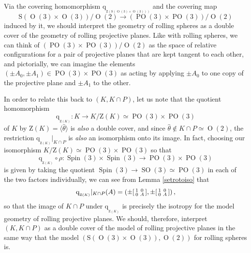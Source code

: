 \documentclass[12pt,a4paper]{amsart}
\theoremstyle{definition}
\DeclareMathOperator{\Orth}{O}
\DeclareMathOperator{\SOrth}{SO}
\DeclareMathOperator{\Spin}{Spin}
\DeclareMathOperator{\POrth}{PO}
\newcommand{\quot}[1]{\mathrm{q}_{{}_{#1}}}
\newenvironment{smallbmatrix}
  {\left[\begin{smallmatrix}}
  {\end{smallmatrix}\right]}
\begin{document}
Via the covering homomorphism $\quot{\mathrm{Z}(\mathrm{S}(\Orth(3)\times\Orth(3)))}$ and the covering map
\[\mathrm{S}(\Orth(3)\times\Orth(3))/\Orth(2)\to(\POrth(3)\times\POrth(3))/\Orth(2)\]
induced by it, we should interpret the geometry of rolling spheres as a double cover of the geometry of rolling projective planes. Like with rolling spheres, we can think of $(\POrth(3)\times\POrth(3))/\Orth(2)$ as the space of relative configurations for a pair of projective planes that are kept tangent to each other, and pictorially, we can imagine the elements $(\pm A_0,\pm A_1)\in\POrth(3)\times\POrth(3)$ as acting by applying $\pm A_0$ to one copy of the projective plane and $\pm A_1$ to the other.

In order to relate this back to $(K,K\cap P)$, let us note that the quotient homomorphism
\[\quot{\mathrm{Z}(K)}\!:K\to K/\mathrm{Z}(K)\simeq\POrth(3)\times\POrth(3)\]
of $K$ by $\mathrm{Z}(K)=\langle\hat{\theta}\rangle$ is \textit{also} a double cover, and since $\hat{\theta}\not\in K\cap P\simeq\Orth(2)$, the restriction $\quot{\mathrm{Z}(K)}|_{K\cap P}$ is \textit{also} an isomorphism onto its image. In fact, choosing our isomorphism $K/\mathrm{Z}(K)\simeq\POrth(3)\times\POrth(3)$ so that
\[\quot{\mathrm{Z}(K)}\circ\rho:\Spin(3)\times\Spin(3)\to\POrth(3)\times\POrth(3)\]
is given by taking the quotient $\Spin(3)\to\SOrth(3)\simeq\POrth(3)$ in each of the two factors individually, we can see from Lemma \ref{setrotoiso} that
\[\quot{\mathrm{Z}(K)}|_{K\cap P}(A)=\left(\pm\begin{smallbmatrix}1 & 0 \\ 0 & A\end{smallbmatrix},\pm\begin{smallbmatrix}1 & 0 \\ 0 & A\end{smallbmatrix}\right),\]
so that the image of $K\cap P$ under $\quot{\mathrm{Z}(K)}$ is precisely the isotropy for the model geometry of rolling projective planes. We should, therefore, interpret $(K,K\cap P)$ as a double cover of the model of rolling projective planes in the same way that the model $(\mathrm{S}(\Orth(3)\times\Orth(3)),\Orth(2))$ for rolling spheres is.

\end{document}
